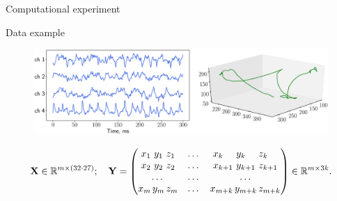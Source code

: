 \documentclass[9pt]{beamer}
\newcommand{\bY}{\mathbf{Y}}
\newcommand{\bX}{\mathbf{X}}
\newcommand{\bbR}{\mathbb{R}}
\begin{document}
\begin{frame}{Computational experiment}
\begin{block}{Data example}
	\begin{figure}
		\includegraphics[width=\linewidth]{figs/ecog_data}
	\end{figure}
\end{block}

\[
	\bX \in \bbR^{m \times (32 \cdot 27)}; \quad 
	\bY = 
	\begin{pmatrix}
	x_1 \,\, y_1 \,\, z_1 & \dots & x_{k\hphantom{+1}} \,\, y_{k\hphantom{+1}} \,\, z_{k\hphantom{+1}}\\
	x_2 \,\, y_2 \,\, z_2 & \dots & x_{k + 1} \,\, y_{k + 1} \,\, z_{k + 1}\\
	 \dots & \dots & \dots  \\
	x_m \, y_m \, z_m & \dots & x_{m + k} \, y_{m + k} \, z_{m + k}
	\end{pmatrix} \in \bbR^{m \times 3k}.
\]

\end{frame}
\end{document}

